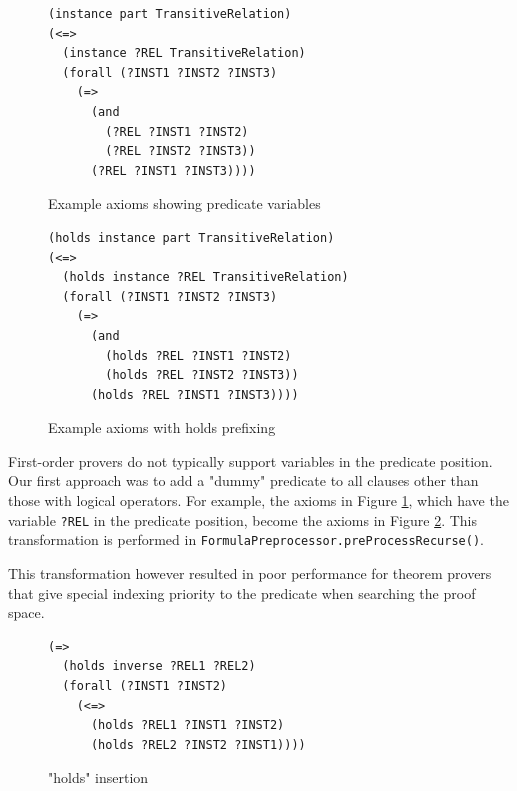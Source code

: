 \documentclass{book}
\begin{document}
\begin{figure}
\begin{framed}
\label{fig:PredVarEx}
\begin{verbatim}
(instance part TransitiveRelation)
(<=>
  (instance ?REL TransitiveRelation)
  (forall (?INST1 ?INST2 ?INST3)
    (=>
      (and
        (?REL ?INST1 ?INST2)
        (?REL ?INST2 ?INST3))
      (?REL ?INST1 ?INST3))))
\end{verbatim}
\caption{Example axioms showing predicate variables}
\end{framed}   
\end{figure}

\begin{figure}
\begin{framed}
\label{fig:HoldsPrefix}
\begin{verbatim}
(holds instance part TransitiveRelation)
(<=>
  (holds instance ?REL TransitiveRelation)
  (forall (?INST1 ?INST2 ?INST3)
    (=>
      (and
        (holds ?REL ?INST1 ?INST2)
        (holds ?REL ?INST2 ?INST3))
      (holds ?REL ?INST1 ?INST3))))
\end{verbatim}
\caption{Example axioms with holds prefixing}
\end{framed} 
\end{figure}

First-order provers do not typically support variables in the predicate
position. Our first approach was to add a "dummy" predicate to all clauses other
than those with logical operators.   For example, the axioms in Figure
\ref{fig:PredVarEx}, which have the variable {\tt ?REL} in the predicate
position, become the axioms in Figure \ref{fig:HoldsPrefix}.  This transformation
is performed in \texttt{FormulaPreprocessor.preProcessRecurse()}.

This transformation however resulted in poor performance for theorem provers
that give special indexing priority to the predicate when searching the proof
space.

\begin{figure}
\begin{framed}
\label{fig:HoldsInsert}
\begin{verbatim}
(=>
  (holds inverse ?REL1 ?REL2)
  (forall (?INST1 ?INST2)
    (<=>
      (holds ?REL1 ?INST1 ?INST2)
      (holds ?REL2 ?INST2 ?INST1))))
\end{verbatim}
\caption{"holds" insertion}
\end{framed} 
\end{figure}
\end{document}
